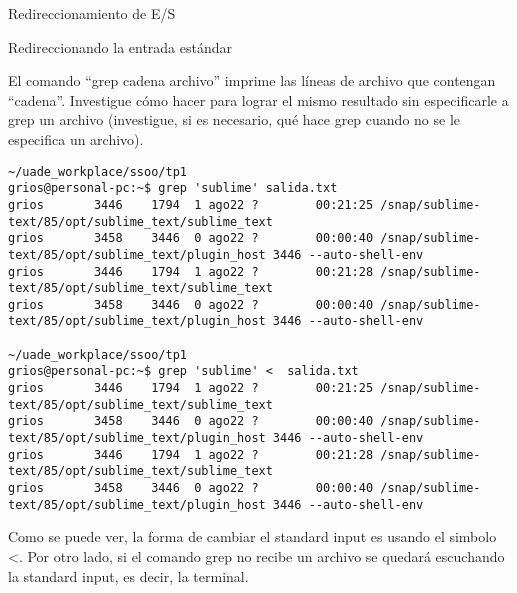 \begin{section}{Redireccionamiento de E/S}
\begin{subsection}{Redireccionando la entrada estándar}
\begin{quoting}
El comando “grep cadena archivo” imprime las líneas de archivo que contengan “cadena”.
Investigue cómo hacer para lograr el mismo resultado sin especificarle a grep un archivo (investigue, si es
necesario, qué hace grep cuando no se le especifica un archivo).
\end{quoting}
\begin{lstlisting}[style=Ubuntu]
~/uade_workplace/ssoo/tp1
grios@personal-pc:~$ grep 'sublime' salida.txt   
grios       3446    1794  1 ago22 ?        00:21:25 /snap/sublime-text/85/opt/sublime_text/sublime_text
grios       3458    3446  0 ago22 ?        00:00:40 /snap/sublime-text/85/opt/sublime_text/plugin_host 3446 --auto-shell-env
grios       3446    1794  1 ago22 ?        00:21:28 /snap/sublime-text/85/opt/sublime_text/sublime_text
grios       3458    3446  0 ago22 ?        00:00:40 /snap/sublime-text/85/opt/sublime_text/plugin_host 3446 --auto-shell-env

~/uade_workplace/ssoo/tp1
grios@personal-pc:~$ grep 'sublime' <  salida.txt
grios       3446    1794  1 ago22 ?        00:21:25 /snap/sublime-text/85/opt/sublime_text/sublime_text
grios       3458    3446  0 ago22 ?        00:00:40 /snap/sublime-text/85/opt/sublime_text/plugin_host 3446 --auto-shell-env
grios       3446    1794  1 ago22 ?        00:21:28 /snap/sublime-text/85/opt/sublime_text/sublime_text
grios       3458    3446  0 ago22 ?        00:00:40 /snap/sublime-text/85/opt/sublime_text/plugin_host 3446 --auto-shell-env

\end{lstlisting}

Como se puede ver, la forma de cambiar el standard input es usando el simbolo <.
Por otro lado, si el comando grep no recibe un archivo se quedará escuchando la standard input, es decir, la terminal.

\end{subsection}

\end{section}